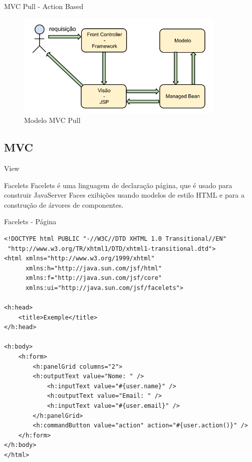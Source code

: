 \documentclass[xcolor=dvipsnames]{beamer}
\begin{document}
	\begin{frame}{MVC Pull - Action Based}
		\begin{figure}[!htb]
			\centering
			\includegraphics[keepaspectratio=true,height=5cm]{mvc-pull.png}
			\caption{Modelo MVC Pull}
			\label{rec-ER}
		\end{figure}				

	\end{frame}	

\subsection{MVC}
	\begin{frame}[fragile]{View}
		\begin{block}{Facelets}
Facelets é uma linguagem de declaração página, que é usado para construir JavaServer Faces exibições usando modelos de estilo HTML e para a construção de árvores de componentes.
		\end{block}
	\end{frame}	

\begin{frame}[fragile]{Facelets - Página}
		
	\begin{lstlisting}[style=HTML]
<!DOCTYPE html PUBLIC "-//W3C//DTD XHTML 1.0 Transitional//EN"
 "http://www.w3.org/TR/xhtml1/DTD/xhtml1-transitional.dtd"> 
<html xmlns="http://www.w3.org/1999/xhtml"
      xmlns:h="http://java.sun.com/jsf/html"
      xmlns:f="http://java.sun.com/jsf/core"
      xmlns:ui="http://java.sun.com/jsf/facelets"> 

<h:head>
	<title>Exemple</title>
</h:head>
 
<h:body> 
	<h:form>
		<h:panelGrid columns="2">
		<h:outputText value="Nome: " />
			<h:inputText value="#{user.name}" />
			<h:outputText value="Email: " />
			<h:inputText value="#{user.email}" />		
		</h:panelGrid>
		<h:commandButton value="action" action="#{user.action()}" />
	</h:form>
</h:body> 
</html>
	\end{lstlisting}		

\end{frame}
\end{document}
